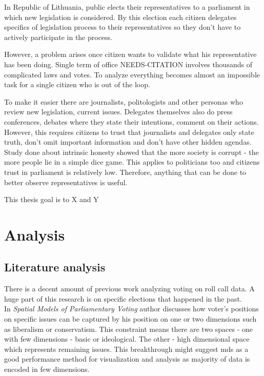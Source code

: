 \documentclass[a4paper,12pt]{article}
\begin{document}
    In Republic of Lithuania, public elects their representatives to a parliament in which new legislation is considered. By this election each citizen delegates specifics of legislation process to their representatives so they don't have to actively participate in the process.
	
	However, a problem arises once citizen wants to validate what his representative has been doing. Single term of office NEEDS-CITATION involves thousands of complicated laws and votes. To analyze everything becomes almost an impossible task for a single citizen who is out of the loop. 
	
	To make it easier there are journalists, politologists and other personas who review new legislation, current issues. Delegates themselves also do press conferences, debates where they state their intentions, comment on their actions. However, this requires citizens to trust that journalists and delegates only state truth, don't omit important information and don't have other hidden agendas. Study done about intrinsic honesty showed that the more society is corrupt - the more people lie in a simple dice game. This applies to politicians too and citizens trust in parliament is relatively low.  Therefore, anything that can be done to better observe representatives is useful.

	This thesis goal is to X and Y
    
    \clearpage
    
    \section{Analysis}
   
   	\subsection{Literature analysis}
   	
	There is a decent amount of previous work analyzing voting on roll call data. A huge part of this research is on specific elections that happened in the past.\\	
	
	In \textit{Spatial Models of Parliamentary Voting} \cite{poole_2005} author discusses how voter's positions on specific issues can be captured by his position on one or two dimensions such as liberalism or conservatism. This constraint means there are two spaces - one with few dimensions - basic  or ideological. The other - high dimensional space which represents remaining issues. This breakthrough might suggest \acrlong{mds} as a good performance method for visualization and analysis as majority of data is encoded in few dimensions.\\
	
\end{document}
